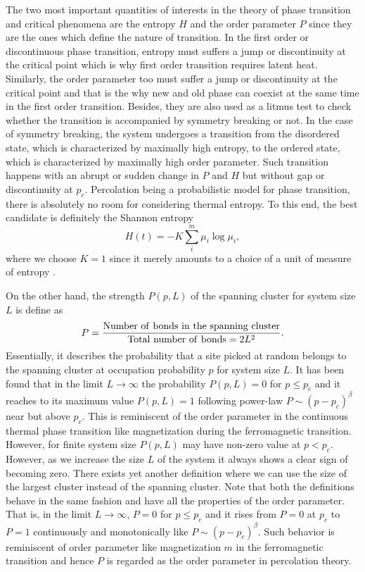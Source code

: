 	The two most important quantities of interests in the theory of phase transition and critical phenomena 
	are the entropy $H$ and the order parameter $P$ since they are the ones
	which define the nature of transition. In the first order or discontinuous phase transition,
	entropy must suffers a jump or discontinuity at the critical point which is 
	why first order transition
	requires latent heat. Similarly, the order parameter too must suffer a jump or discontinuity at
	the critical point and that is the why new and old 
	phase can coexist at the same time in the first order transition. Besides, they are also used as a litmus test to check
	whether the transition is accompanied by symmetry breaking or not. In the case of symmetry breaking,
	the system undergoes a transition from the disordered state, which is characterized by maximally high
	entropy, to the ordered state, which is characterized by maximally high order parameter. 
	Such transition happens with an abrupt or sudden
	change in $P$ and $H$ but without gap or discontinuity at $p_c$. 
	Percolation being a probabilistic model for phase transition, there is
	absolutely no room for considering thermal entropy. To this end, the 
	best candidate is definitely the Shannon entropy  
	\begin{equation}
	\label{eq:shannon_entropy}
	H(t)=-K\sum_i^m \mu_i\log \mu_i,
	\end{equation} 
	where we choose $K=1$ since it merely amounts to a choice of a unit of measure of entropy \cite{Shannon1948}. 
	
	
	
	On the other hand, the strength $P(p,L)$ of the spanning cluster for system size $L$
	is define as 
	\begin{equation}
	\label{eq:pp1}
	P={{{\rm Number \ of \ bonds \ in \ the \ spanning \ cluster}}\over{{\rm Total \ 
				number \ of \ bonds }=2L^2}}.
	\end{equation}
	Essentially, it describes the probability that a site 
	picked at random belongs to the spanning cluster at occupation probability $p$ for system size $L$.
	It has been found that in the limit $L\rightarrow \infty$ the probability $P(p,L)=0$ 
	for $p\leq p_c$ and it reaches to its maximum value $P(p,L)=1$ 
	following power-law $P\sim (p-p_c)^\beta$ near but above $p_c$. This is reminiscent 
	of the order parameter in the continuous thermal phase transition like magnetization
	during the ferromagnetic transition.  However, for finite system size $P(p,L)$ may have non-zero
	value at $p<p_c$. However, as we increase the size $L$ of the system it always shows a clear sign
	of becoming zero. There exists yet another definition where 
	we can use the size of the largest cluster instead of the spanning cluster. Note that both the definitions 
	behave in the same fashion and have all the properties of the order parameter. That is,  
	in the limit $L\rightarrow \infty$, 
	$P=0$ for $p\leq p_c$ and it rises from $P=0$ at $p_c$ to $P=1$ continuously and monotonically like $P\sim (p-p_c)^\beta$. 
	Such behavior is reminiscent of order parameter like magnetization $m$ in the ferromagnetic transition and
	hence $P$ is regarded as the order parameter in percolation theory. 
	
